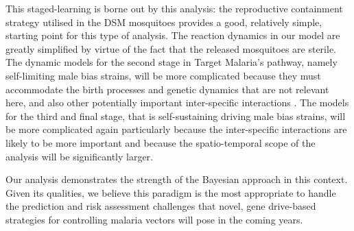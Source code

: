 \documentclass[]{bmcart}
\begin{document}
This staged-learning is borne out by this analysis: the reproductive containment strategy utilised in the DSM mosquitoes provides a good, relatively simple, starting point for this type of analysis. The reaction dynamics in our model are greatly simplified by virtue of the fact that the released mosquitoes are sterile. The dynamic models for the second stage in Target Malaria's pathway, namely self-limiting male bias strains, will be more complicated because they must accommodate the birth processes and genetic dynamics that are not relevant here, and also other potentially important inter-specific interactions \citep{Beeton2020}. The models for the third and final stage, that is self-sustaining driving male bias strains, will be more complicated again particularly because the inter-specific interactions are likely to be more important and because the spatio-temporal scope of the analysis will be significantly larger.

Our analysis demonstrates the strength of the Bayesian approach in this context. Given its qualities, we believe this paradigm is the most appropriate to handle the prediction and risk assessment challenges that novel, gene drive-based strategies for controlling malaria vectors will pose in the coming years.

\end{document}
